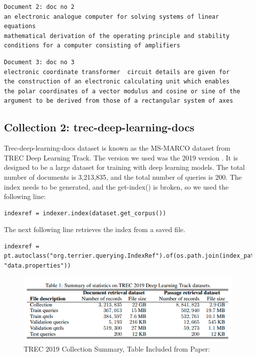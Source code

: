 \documentclass[letterpaper,12pt]{article}
\begin{document}
\begin{lstlisting}[frame=single]  
Document 2: doc no 2
an electronic analogue computer for solving systems of linear equations
mathematical derivation of the operating principle and stability
conditions for a computer consisting of amplifiers
\end{lstlisting}

\begin{lstlisting}[frame=single]  
Document 3: doc no 3
electronic coordinate transformer  circuit details are given for
the construction of an electronic calculating unit which enables
the polar coordinates of a vector modulus and cosine or sine of the
argument to be derived from those of a rectangular system of axes
\end{lstlisting}



\subsection{Collection 2: trec-deep-learning-docs}

Trec-deep-learning-docs dataset is known as the MS-MARCO dataset from TREC Deep Learning Track. 
The version we used was the 2019 version \cite{trec-deep-learning}.
It is designed to be a large dataset for training with deep learning models. The total number of documents is 3,213,835, and the total number of queries is 200.
The index needs to be generated, and the get-index() is broken, so we used the following line:

\begin{lstlisting}[frame=single]  
indexref = indexer.index(dataset.get_corpus())
\end{lstlisting}
The next following line retrieves the index from a saved file. 

\begin{lstlisting}[frame=single]  
indexref = pt.autoclass("org.terrier.querying.IndexRef").of(os.path.join(index_path, "data.properties"))
\end{lstlisting}


\begin{figure}[h!]
    \centering  %
    \includegraphics[width=1\textwidth]{table_trec.png} %
    \caption{TREC 2019 Collection Summary, Table Included from Paper: \cite{trec-deep-learning}}%
    \label{fig:trec_table} %
\end{figure}
\end{document}
